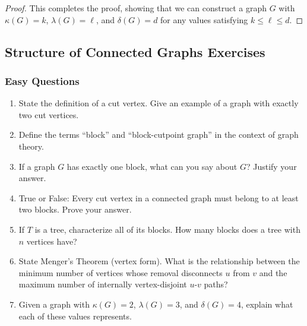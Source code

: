 \documentclass{article}
\theoremstyle{definition}
\begin{document}
\begin{proof}
This completes the proof, showing that we can construct a graph $G$ with $\kappa(G) = k$, $\lambda(G) = \ell$, and $\delta(G) = d$ for any values satisfying $k \leq \ell \leq d$.
\end{proof}

\subsection{Structure of Connected Graphs Exercises}

\subsubsection{Easy Questions}
\begin{enumerate}
\item State the definition of a cut vertex. Give an example of a graph with exactly two cut vertices.

\item Define the terms ``block'' and ``block-cutpoint graph'' in the context of graph theory.

\item If a graph $G$ has exactly one block, what can you say about $G$? Justify your answer.

\item True or False: Every cut vertex in a connected graph must belong to at least two blocks. Prove your answer.

\item If $T$ is a tree, characterize all of its blocks. How many blocks does a tree with $n$ vertices have?

\item State Menger's Theorem (vertex form). What is the relationship between the minimum number of vertices whose removal disconnects $u$ from $v$ and the maximum number of internally vertex-disjoint $u$-$v$ paths?

\item Given a graph with $\kappa(G) = 2$, $\lambda(G) = 3$, and $\delta(G) = 4$, explain what each of these values represents.
\end{enumerate}
\end{document}
